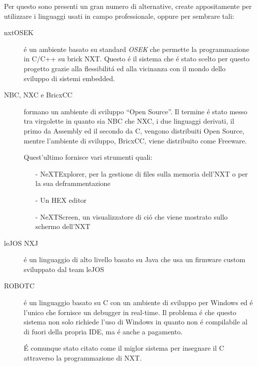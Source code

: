 Per questo sono presenti un gran numero di alternative, create
appositamente per utilizzare i linguaggi usati in campo professionale,
oppure per sembrare tali:
\begin{description}
    \item[nxtOSEK]\'e un ambiente basato su standard \emph{OSEK} che
        permette la programmazione in C/C++ su brick NXT. Questo \'e il
        sistema che \'e stato scelto per questo progetto grazie alla
        flessibilit\'a ed alla vicinanza con il mondo dello sviluppo di
        sistemi embedded.
    \item[NBC, NXC e BricxCC]formano un ambiente di sviluppo ``Open
        Source''. Il termine \'e stato messo tra virgolette in quanto sia
        NBC che NXC, i due linguaggi derivati, il primo da Assembly ed il
        secondo da C, vengono distribuiti Open Source, mentre l'ambiente di
        sviluppo, BricxCC, viene distribuito come Freeware.

        Quest'ultimo fornisce vari strumenti quali:
        \begin{itemize}
            \item[-]NeXTExplorer, per la gestione di files sulla memoria
                dell'NXT o per la sua deframmentazione
            \item[-]Un HEX editor
            \item[-]NeXTScreen, un visualizzatore di ci\'o che viene
                mostrato sullo schermo dell'NXT
        \end{itemize}
    \item[leJOS NXJ]\cite{bib:lejos}\'e un linguaggio di alto livello
        basato su Java che usa un firmware custom sviluppato dal team leJOS
    \item[ROBOTC]\cite{bib:robotc}\'e un linguaggio basato su C con un
        ambiente di sviluppo per Windows ed \'e l'unico che fornisce un
        debugger in real-time.
        Il problema \'e che questo sistema non solo richiede l'uso di
        Windows in quanto non \'e compilabile al di fuori della propria
        IDE, ma \'e anche a pagamento.

        \'E comunque stato citato come il miglor sistema per insegnare il C
        attraverso la programmazione di NXT\cite{bib:rcarticle}.
\end{description}


